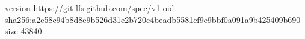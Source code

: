 version https://git-lfs.github.com/spec/v1
oid sha256:a2e58c94b8d8e9b526d31e2b720c4beadb5581cf9e9bbf0a091a9b425409b690
size 43840
